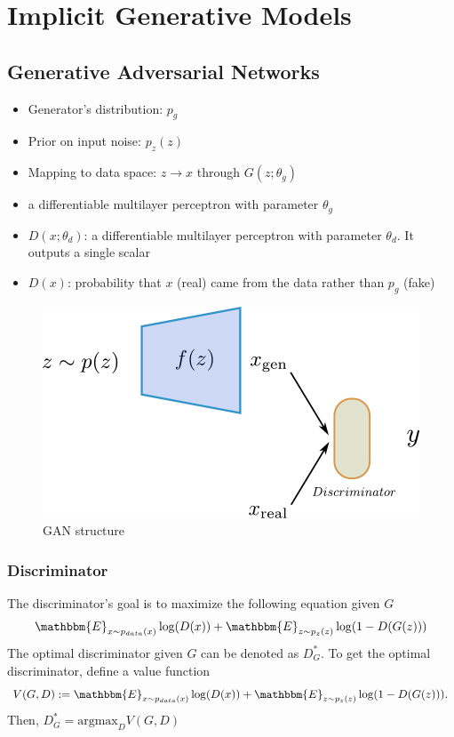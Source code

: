 \chapter{Implicit Generative Models}
\section{Generative Adversarial Networks}
\label{sec:gan}
\begin{itemize}
	\item Generator's distribution: $p_{g}$
	\item Prior on input noise: $p_{z}(z)$
	\item Mapping to data space: $z\rightarrow x$ through $G(z;\theta_{g})$
	\item[] a differentiable multilayer perceptron with parameter $\theta_{g}$
	\item $D(x;\theta_{d})$: a differentiable multilayer perceptron with parameter $\theta_{d}$. It outputs a single scalar 
	\item $D(x)$: probability that $x$ (real) came from the data rather than $p_g$ (fake)
\end{itemize}

\begin{figure}[h]
	\begin{center}
		\includegraphics[scale=0.5]{./images/generative/gan/gan_model.pdf}
	\end{center}
	\caption{GAN structure}
	\label{fig:gan}
\end{figure}

\subsection{Discriminator}
The discriminator's goal is to maximize the following equation given $G$
\begin{equation*}
\mathbbm{E}_{x \sim p_{data}(x)}\log(D(x))+\mathbbm{E}_{z \sim p_{z}(z)}\log(1-D(G(z)))
\end{equation*}
The optimal discriminator given $G$ can be denoted as $D^*_{G}$. To get the optimal discriminator, define a value function
\begin{equation*}
V(G,D):= \mathbbm{E}_{x \sim p_{data}(x)}\log(D(x))+\mathbbm{E}_{z \sim p_z(z)}\log(1-D(G(z))).
\end{equation*}
Then, $D_G^* = \text{argmax}_D V(G,D)$

